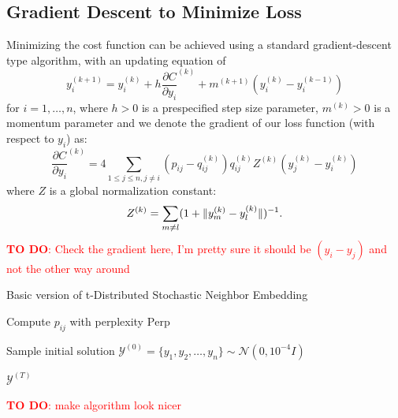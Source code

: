 \subsection{Gradient Descent to Minimize Loss}
Minimizing the cost function can be achieved using a standard gradient-descent type algorithm, with an updating equation of 
\begin{equation}
    y_i^{(k+1)} = y_i^{(k)} + h \frac{\partial C}{\partial y_i}^{(k)} + m^{(k+1)}(y_i^{(k)} - y_i^{(k-1)}) 
\end{equation}
for $i=1,\dots,n$, where $h >0$ is a prespecified step size parameter, $m^{(k)} > 0$ is a momentum parameter and we denote the gradient of our loss function (with respect to $y_i$) as: 
\begin{equation}
    \frac{\partial C}{\partial y_i}^{(k)} = 4 \sum_{1 \leq j \leq n, j \neq i} (p_{ij} - q_{ij}^{(k)}) q_{ij}^{(k)} Z^{(k)} (y_j^{(k)} - y_i^{(k)})
\end{equation}
where $Z$ is a global normalization constant: 
\begin{equation}
    Z^{(k)} = \sum_{m \neq l} (1 + \lVert y_m^{(k)} - y_l^{(k)}\rVert)^{-1}. 
\end{equation}
\textcolor{red}{\textbf{TO DO}: Check the gradient here, I'm pretty sure it should be $(y_i - y_j)$ and not the other way around}


\begin{algorithm}[H]
    \caption{Basic version of t-Distributed Stochastic Neighbor Embedding}
    \label{alg:tsne}


    Compute $p_{ij}$ with perplexity $\text{Perp}$ 
    
    Sample initial solution $\mathcal{Y}^{(0)} = \{y_1, y_2, \dots, y_n\} \sim \mathcal{N}(0, 10^{-4} I)$\


    \Return $\mathcal{Y}^{(T)}$\
\end{algorithm}
\textcolor{red}{\textbf{TO DO}: make algorithm look nicer}


